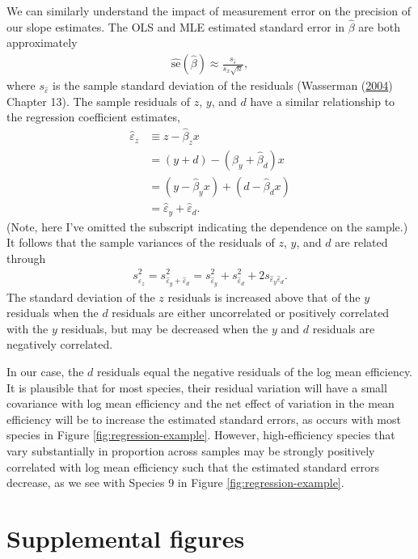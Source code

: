 \documentclass[
]{article}
\begin{document}
We can similarly understand the impact of measurement error on the precision of our slope estimates.
The OLS and MLE estimated standard error in \(\hat \beta\) are both approximately
\begin{align}
  \hat{\text{se}}(\hat \beta)
  \approx \frac{s_{\hat \varepsilon}}{s_x \sqrt{n}},
\end{align}
where \(s_{\hat \varepsilon}\) is the sample standard deviation of the residuals
(Wasserman (\protect\hyperlink{ref-wasserman2004allo}{2004}) Chapter 13).
The sample residuals of \(z\), \(y\), and \(d\) have a similar relationship to the regression coefficient estimates,
\begin{align}
  \hat \varepsilon_z 
    &\equiv z - \hat \beta_z x
  \\&= (y + d) - (\hat \beta_y + \hat \beta_d) x
  \\&= (y - \hat \beta_y x) + (d - \hat \beta_d x)
  \\&= \hat \varepsilon_y + \hat \varepsilon_d.
\end{align}
(Note, here I've omitted the subscript indicating the dependence on the sample.)
It follows that the sample variances of the residuals of \(z\), \(y\), and \(d\) are related through
\begin{align}
  s^2_{\hat \varepsilon_{z}} 
  = s^2_{\hat \varepsilon_{y} + \hat \varepsilon_{d}}
  = s^2_{\hat \varepsilon_{y}} + s^2_{\hat \varepsilon_{d}} + 2 s_{\hat \varepsilon_{y} \hat \varepsilon_{d}}.
\end{align}
The standard deviation of the \(z\) residuals is increased above that of the \(y\) residuals when the \(d\) residuals are either uncorrelated or positively correlated with the \(y\) residuals, but may be decreased when the \(y\) and \(d\) residuals are negatively correlated.

In our case, the \(d\) residuals equal the negative residuals of the log mean efficiency.
It is plausible that for most species, their residual variation will have a small covariance with log mean efficiency and the net effect of variation in the mean efficiency will be to increase the estimated standard errors, as occurs with most species in Figure \ref{fig:regression-example}.
However, high-efficiency species that vary substantially in proportion across samples may be strongly positively correlated with log mean efficiency such that the estimated standard errors decrease, as we see with Species 9 in Figure \ref{fig:regression-example}.

\hypertarget{supplemental-figures}{%
\section{Supplemental figures}\label{supplemental-figures}}
\end{document}
